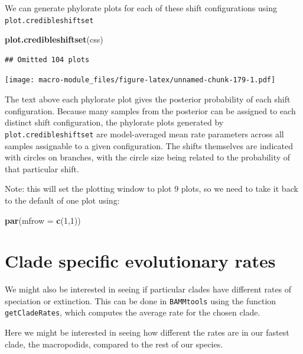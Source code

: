 \documentclass[]{book}
\newenvironment{Shaded}{\begin{snugshade}}{\end{snugshade}}
\newcommand{\KeywordTok}[1]{\textcolor[rgb]{0.13,0.29,0.53}{\textbf{{#1}}}}
\newcommand{\DataTypeTok}[1]{\textcolor[rgb]{0.13,0.29,0.53}{{#1}}}
\newcommand{\DecValTok}[1]{\textcolor[rgb]{0.00,0.00,0.81}{{#1}}}
\newcommand{\NormalTok}[1]{{#1}}
\theoremstyle{definition}
\theoremstyle{definition}
\theoremstyle{definition}
\theoremstyle{remark}
\begin{document}
We can generate phylorate plots for each of these shift configurations
using \texttt{plot.credibleshiftset}

\begin{Shaded}
\begin{Highlighting}[]
\KeywordTok{plot.credibleshiftset}\NormalTok{(css)}
\end{Highlighting}
\end{Shaded}

\begin{verbatim}
## Omitted 104 plots
\end{verbatim}

\texttt{[image: macro-module\_files/figure-latex/unnamed-chunk-179-1.pdf]}

The text above each phylorate plot gives the posterior probability of
each shift configuration. Because many samples from the posterior can be
assigned to each distinct shift configuration, the phylorate plots
generated by \texttt{plot.credibleshiftset} are model-averaged mean rate
parameters across all samples assignable to a given configuration. The
shifts themselves are indicated with circles on branches, with the
circle size being related to the probability of that particular shift.

Note: this will set the plotting window to plot 9 plots, so we need to
take it back to the default of one plot using:

\begin{Shaded}
\begin{Highlighting}[]
\KeywordTok{par}\NormalTok{(}\DataTypeTok{mfrow =} \KeywordTok{c}\NormalTok{(}\DecValTok{1}\NormalTok{,}\DecValTok{1}\NormalTok{))}
\end{Highlighting}
\end{Shaded}

\section{Clade specific evolutionary
rates}\label{clade-specific-evolutionary-rates}

We might also be interested in seeing if particular clades have
different rates of speciation or extinction. This can be done in
\texttt{BAMMtools} using the function \texttt{getCladeRates}, which
computes the average rate for the chosen clade.

Here we might be interested in seeing how different the rates are in our
fastest clade, the macropodids, compared to the rest of our species.
\end{document}
